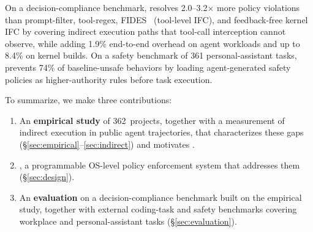 On a decision-compliance benchmark, \sys{} resolves 2.0--3.2$\times$ more policy violations than prompt-filter, tool-regex, FIDES~\cite{costa2025fides} (tool-level IFC), and feedback-free kernel IFC by covering indirect execution paths that tool-call interception cannot observe, while adding 1.9\% end-to-end overhead on agent workloads and up to 8.4\% on kernel builds.
On a safety benchmark of 361 personal-assistant tasks, \sys{} prevents 74\% of baseline-unsafe behaviors by loading agent-generated safety policies as higher-authority rules before task execution.


To summarize, we make three contributions:
\begin{enumerate}
\item An \textbf{empirical study} of 362~projects, together with a measurement of indirect execution in public agent trajectories, that characterizes these gaps (\S\ref{sec:empirical}--\ref{sec:indirect}) and motivates \sys{}.
\item \textbf{\sys{}}, a programmable OS-level policy enforcement system that addresses them (\S\ref{sec:design}).
\item An \textbf{evaluation} on a decision-compliance benchmark built on the empirical study, together with external coding-task and safety benchmarks covering workplace and personal-assistant tasks (\S\ref{sec:evaluation}).
\end{enumerate}
